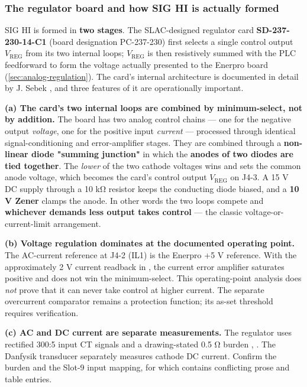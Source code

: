 \subsubsection{The regulator board and how SIG HI is actually formed}

SIG HI is formed in \textbf{two stages}. The SLAC-designed regulator card \textbf{SD-237-230-14-C1} (board designation PC-237-230) first selects a single control output $V_\text{REG}$ from its two internal loops; $V_\text{REG}$ is then resistively summed with the PLC feedforward to form the voltage actually presented to the Enerpro board (\cref{sec:analog-regulation}). The card's internal architecture is documented in detail by J. Sebek , and three features of it are operationally important.

\textbf{(a) The card's two internal loops are combined by minimum-select, not by addition.} The board has two analog control chains --- one for the negative output \emph{voltage}, one for the positive input \emph{current} --- processed through identical signal-conditioning and error-amplifier stages. They are combined through a \textbf{non-linear diode "summing junction"} in which the \textbf{anodes of two diodes are tied together}. The \emph{lower} of the two cathode voltages wins and sets the common anode voltage, which becomes the card's control output $V_\text{REG}$ on J4-3. A 15 V DC supply through a 10 kΩ resistor keeps the conducting diode biased, and a \textbf{10 V Zener} clamps the anode. In other words the two loops compete and \textbf{whichever demands less output takes control} --- the classic voltage-or-current-limit arrangement.

\textbf{(b) Voltage regulation dominates at the documented operating point.} The AC-current reference at J4-2 (IL1) is the Enerpro +5 V reference. With the approximately 2 V current readback in , the current error amplifier saturates positive and does not win the minimum-select. This operating-point analysis does \emph{not} prove that it can never take control at higher current. The separate overcurrent comparator remains a protection function; its as-set threshold requires verification.

\textbf{(c) AC and DC current are separate measurements.} The regulator uses rectified 300:5 input CT signals and a drawing-stated 0.5 Ω burden , . The Danfysik transducer separately measures cathode DC current. Confirm the burden and the Slot-9 input mapping, for which  contains conflicting prose and table entries.

